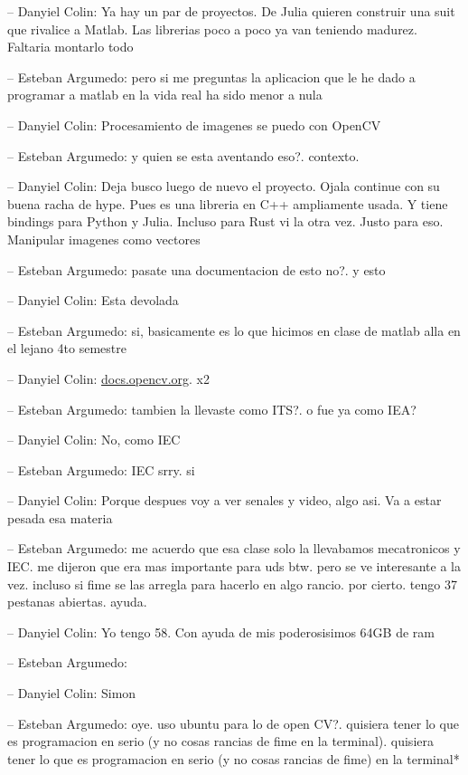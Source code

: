-- Danyiel Colin: Ya hay un par de proyectos. De Julia quieren construir
una suit que rivalice a Matlab. Las librerias poco a poco ya van
teniendo madurez. Faltaria montarlo todo

-- Esteban Argumedo: pero si me preguntas la aplicacion que le he dado a
programar a matlab en la vida real ha sido menor a nula

-- Danyiel Colin: Procesamiento de imagenes se puedo con OpenCV

-- Esteban Argumedo: y quien se esta aventando eso?. contexto.

-- Danyiel Colin: Deja busco luego de nuevo el proyecto. Ojala continue
con su buena racha de hype. Pues es una libreria en C++ ampliamente
usada. Y tiene bindings para Python y Julia. Incluso para Rust vi la
otra vez. Justo para eso. Manipular imagenes como vectores

-- Esteban Argumedo: pasate una documentacion de esto no?. y esto

-- Danyiel Colin: Esta devolada

-- Esteban Argumedo: si, basicamente es lo que hicimos en clase de
matlab alla en el lejano 4to semestre

-- Danyiel Colin:
\href{https://docs.opencv.org/4.x/d6/d00/tutorial_py_root.html}{docs.opencv.org}.
x2

-- Esteban Argumedo: tambien la llevaste como ITS?. o fue ya como IEA?

-- Danyiel Colin: No, como IEC

-- Esteban Argumedo: IEC srry. si

-- Danyiel Colin: Porque despues voy a ver senales y video, algo asi. Va
a estar pesada esa materia

-- Esteban Argumedo: me acuerdo que esa clase solo la llevabamos
mecatronicos y IEC. me dijeron que era mas importante para uds btw. pero
se ve interesante a la vez. incluso si fime se las arregla para hacerlo
en algo rancio. por cierto. tengo 37 pestanas abiertas. ayuda.

-- Danyiel Colin: Yo tengo 58. Con ayuda de mis poderosisimos 64GB de
ram

-- Esteban Argumedo:

-- Danyiel Colin: Simon

-- Esteban Argumedo: oye. uso ubuntu para lo de open CV?. quisiera tener
lo que es programacion en serio (y no cosas rancias de fime en la
terminal). quisiera tener lo que es programacion en serio (y no cosas
rancias de fime) en la terminal*

